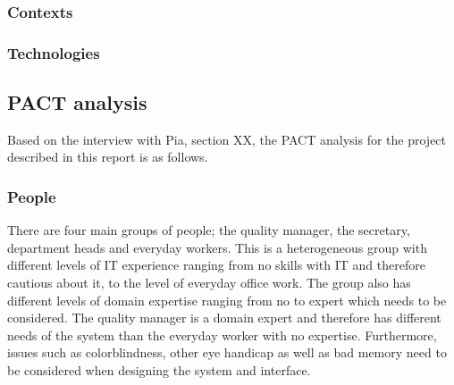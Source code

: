 \subsubsection*{Contexts}

\subsubsection*{Technologies}






































\subsection{PACT analysis}\label{sec:PACT-analysis}
Based on the interview
with Pia,
{\color{red} section XX}, the PACT analysis for the project described in this report is as follows.

\subsubsection*{People}

There are four main groups of people; the quality manager, the secretary, department heads and everyday workers.
This is a heterogeneous group with different levels of IT experience ranging from no skills with IT and therefore cautious about it, to the level of everyday office work.
The group also has different levels of domain expertise ranging from no to expert which needs to be considered. The quality manager is a domain expert and therefore has different needs of the system than the everyday worker with no expertise.
\newline
Furthermore, issues such as colorblindness, other eye handicap as well as bad memory need to be considered when designing the system and interface.


